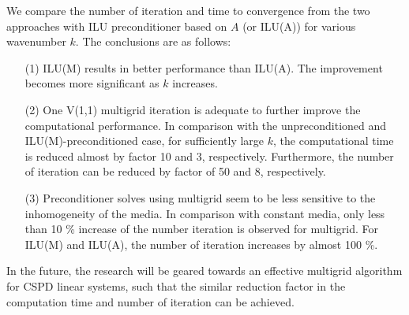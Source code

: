 \documentclass{report}
\begin{document}
We compare the number of iteration and time to convergence from the two
approaches with ILU preconditioner based on $A$ (or ILU(A)) for various
wavenumber $k$. The conclusions are as follows:
\begin{itemize}
\item[(1)] ILU(M) results in better performance than ILU(A). The
improvement becomes more significant as $k$ increases.
\item[(2)] One V(1,1) multigrid iteration is adequate to further improve
the computational performance. In comparison with the unpreconditioned
and ILU(M)-preconditioned case, for sufficiently large $k$, the
computational time is reduced almost by factor 10 and 3, respectively.
Furthermore, the number of iteration can be reduced by factor of 50 and
8, respectively.
\item[(3)] Preconditioner solves using multigrid seem to be less
sensitive to the inhomogeneity of the media. In comparison with constant
media, only less than 10 \% increase of the number iteration is observed
for multigrid. For ILU(M) and ILU(A), the number of iteration increases
by almost 100 \%.
\end{itemize}

In the future, the research will be geared towards an effective multigrid
algorithm for CSPD linear systems, such that the similar reduction factor
in the computation time and number of iteration can be achieved.
\end{document}
